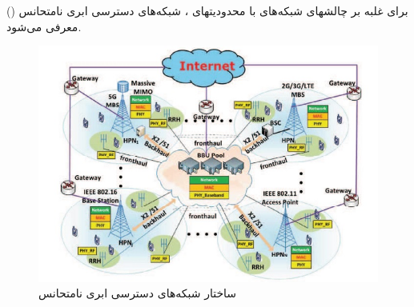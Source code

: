\begin{itemize}
برای غلبه بر چالشهای شبکه‌های  با محدودیتهای ، شبکه‌های دسترسی ابری نامتحانس () معرفی می‌شود\cite{ fogComputing, heterogeneous, fogEdge}.
\begin{figure}
  \centering
    \includegraphics[scale = 0.8]{./fig/hc}
  \caption{ ساختار شبکه‌های دسترسی ابری نامتحانس \cite{heterogeneous}  }
  \label{fig:hc}
\end{figure}


\end{itemize}
